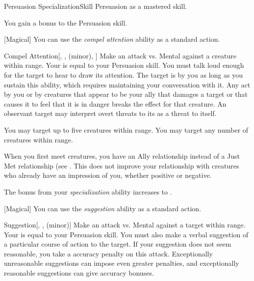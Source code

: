     \begin{feat}{Persuasion Specialization}{Skill}
        \featpre Persuasion as a mastered skill.

         You gain a  bonus to the Persuasion skill.

        [Magical] You can use the \textit{compel attention} ability as a standard action.
        \begin{freeability}{Compel Attention}[, ,  (minor), ]
            Make an attack vs. Mental against a creature within \rngmed range.
            Your  is equal to your Persuasion skill.
            You must talk loud enough for the target to hear to draw its attention.
            \hit The target is \fascinated by you as long as you sustain this ability, which requires maintaining your conversation with it.
            Any act by you or by creatures that appear to be your ally that damages a target or that causes it to feel that it is in danger breaks the effect for that creature.
            An observant target may interpret overt threats to its  as a threat to itself.

            \rankline
             You may target up to five creatures within range.
             You may target any number of creatures within range.
        \end{freeability}

         When you first meet creatures, you have an Ally relationship instead of a Just Met relationship (see .
        This does not improve your relationship with creatures who already have an impression of you, whether positive or negative.

         The bonus from your \textit{specialization} ability increases to .

        [Magical] You can use the \textit{suggestion} ability as a standard action.
        \begin{freeability}{Suggestion}[, ,  (minor)]
            Make an attack vs. Mental against a target within \rngmed range.
            Your  is equal to your Persuasion skill.
            You must also make a verbal suggestion of a particular course of action to the target.
            If your suggestion does not seem reasonable, you take a  accuracy penalty on this attack.
            Exceptionally unreasonable suggestions can impose even greater penalties, and exceptionally reasonable suggestions can give accuracy bonuses.


\end{freeability}
\end{feat}

